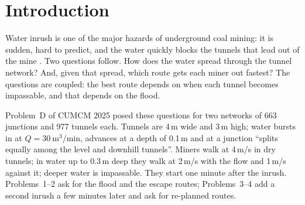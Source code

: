 \documentclass[11pt,a4paper]{article}
\theoremstyle{remark}
\begin{document}
\begin{abstract}
\noindent When water bursts into a mine, the tunnels that miners need to escape are the ones that are filling up. I model a mine as a graph of tunnels and simulate the flood with an event-driven algorithm in which water spreads into level and downhill tunnels, splits equally at junctions, and backs up from dead ends. Unlike the algorithm my team wrote during a 72-hour competition, this model conserves water: the stored volume always equals the inflow, so the network fills exactly at (total volume)/(inflow) --- 35 days for the competition networks, where the competition algorithm predicted that some junctions would stay dry for thousands of years. The flood determines when each tunnel becomes wet and when it becomes impassable, so the time needed to walk through a tunnel depends on when a miner enters it. I prove that a miner who enters a tunnel later never leaves it earlier. This first-in, first-out property makes Dijkstra's algorithm exact on the time-dependent network, shows that waiting never helps, and makes ``the latest safe moment to start'' well defined. On the competition networks all six miners escape within 12--20 minutes of the inrush, five of them on routes that stay completely dry; after a second inrush, re-planning saves up to 7.6 minutes compared with keeping the old route. On an anonymized real mine plan, with 248\,km of tunnels extracted automatically from a CAD drawing, flood-aware routes are up to 40\% faster than the shortest route in a dry mine, and the miner nearest the inrush has a way out only if alerted within 4 minutes 40 seconds.
\end{abstract}

\section{Introduction}

Water inrush is one of the major hazards of underground coal mining: it is sudden, hard to predict, and the water quickly blocks the tunnels that lead out of the mine \cite{guo}. Two questions follow. How does the water spread through the tunnel network? And, given that spread, which route gets each miner out fastest? The questions are coupled: the best route depends on when each tunnel becomes impassable, and that depends on the flood.

Problem~D of CUMCM 2025 \cite{cumcm} posed these questions for two networks of 663 junctions and 977 tunnels each. Tunnels are 4\,m wide and 3\,m high; water bursts in at $Q = 30\ \mathrm{m^3/min}$, advances at a depth of 0.1\,m and at a junction ``splits equally among the level and downhill tunnels''. Miners walk at 4\,m/s in dry tunnels; in water up to 0.3\,m deep they walk at 2\,m/s with the flow and 1\,m/s against it; deeper water is impassable. They start one minute after the inrush. Problems~1--2 ask for the flood and the escape routes; Problems~3--4 add a second inrush a few minutes later and ask for re-planned routes.
\end{document}
